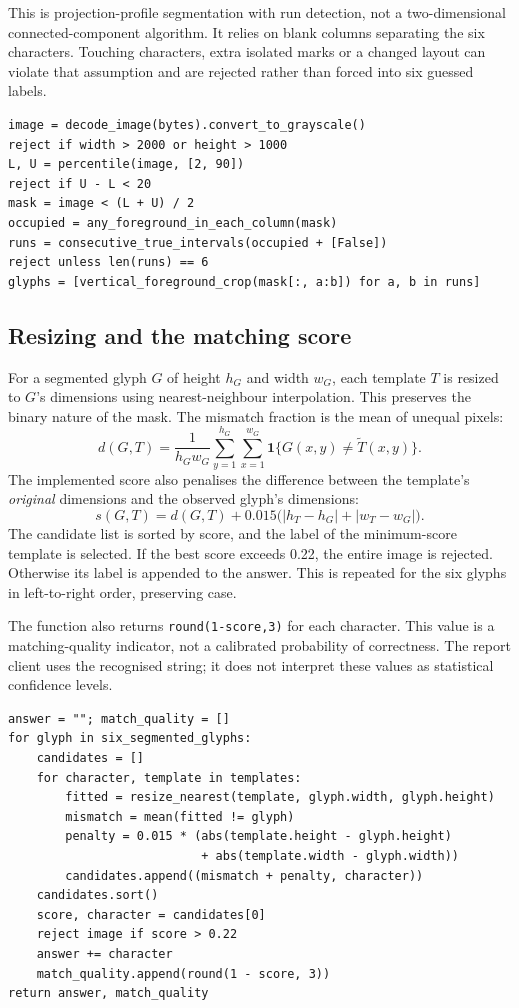 \documentclass[12pt,a4paper,oneside]{report}
\numberwithin{equation}{chapter}
\numberwithin{figure}{chapter}
\numberwithin{table}{chapter}
\theoremstyle{definition}
\begin{document}
This is projection-profile segmentation with run detection, not a two-dimensional connected-component algorithm. It relies on blank columns separating the six characters. Touching characters, extra isolated marks or a changed layout can violate that assumption and are rejected rather than forced into six guessed labels.

\begin{lstlisting}[caption={Algorithm: preprocess and segment the six glyphs}]
image = decode_image(bytes).convert_to_grayscale()
reject if width > 2000 or height > 1000
L, U = percentile(image, [2, 90])
reject if U - L < 20
mask = image < (L + U) / 2
occupied = any_foreground_in_each_column(mask)
runs = consecutive_true_intervals(occupied + [False])
reject unless len(runs) == 6
glyphs = [vertical_foreground_crop(mask[:, a:b]) for a, b in runs]
\end{lstlisting}

\subsection{Resizing and the matching score}
For a segmented glyph $G$ of height $h_G$ and width $w_G$, each template $T$ is resized to $G$'s dimensions using nearest-neighbour interpolation. This preserves the binary nature of the mask. The mismatch fraction is the mean of unequal pixels:
\[
d(G,T)=\frac{1}{h_Gw_G}\sum_{y=1}^{h_G}\sum_{x=1}^{w_G}
\mathbf{1}\{G(x,y)\ne\widetilde T(x,y)\}.
\]
The implemented score also penalises the difference between the template's \emph{original} dimensions and the observed glyph's dimensions:
\[
s(G,T)=d(G,T)+0.015\bigl(|h_T-h_G|+|w_T-w_G|\bigr).
\]
The candidate list is sorted by score, and the label of the minimum-score template is selected. If the best score exceeds 0.22, the entire image is rejected. Otherwise its label is appended to the answer. This is repeated for the six glyphs in left-to-right order, preserving case.

The function also returns \texttt{round(1-score,3)} for each character. This value is a matching-quality indicator, not a calibrated probability of correctness. The report client uses the recognised string; it does not interpret these values as statistical confidence levels.

\begin{lstlisting}[caption={Algorithm: score templates and recognise the CAPTCHA}]
answer = ""; match_quality = []
for glyph in six_segmented_glyphs:
    candidates = []
    for character, template in templates:
        fitted = resize_nearest(template, glyph.width, glyph.height)
        mismatch = mean(fitted != glyph)
        penalty = 0.015 * (abs(template.height - glyph.height)
                           + abs(template.width - glyph.width))
        candidates.append((mismatch + penalty, character))
    candidates.sort()
    score, character = candidates[0]
    reject image if score > 0.22
    answer += character
    match_quality.append(round(1 - score, 3))
return answer, match_quality
\end{lstlisting}
\end{document}
